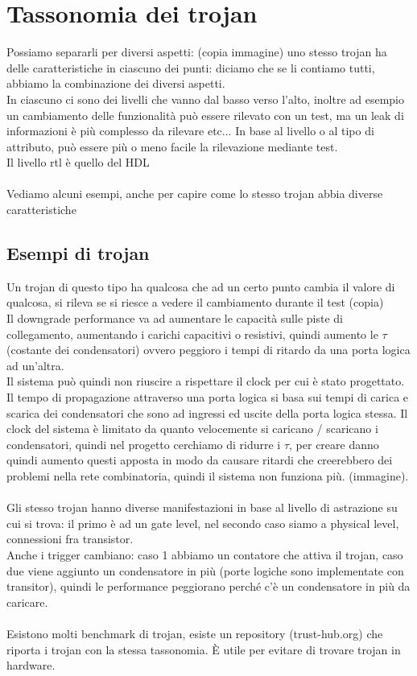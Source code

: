 \documentclass[oneside, 12pt]{extbook}
\begin{document}
\section{Tassonomia dei trojan}
Possiamo separarli per diversi aspetti:
(copia immagine)
uno stesso trojan ha delle caratteristiche in ciascuno dei punti: diciamo che se li contiamo tutti, abbiamo la combinazione dei diversi aspetti.\\In ciascuno ci sono dei livelli che vanno dal basso verso l'alto, inoltre ad esempio un cambiamento delle funzionalità può essere rilevato con un test, ma un leak di informazioni è più complesso da rilevare etc... In base al livello o al tipo di attributo, può essere più o meno facile la rilevazione mediante test.\\Il livello rtl è quello del HDL\\\\Vediamo alcuni esempi, anche per capire come lo stesso trojan abbia diverse caratteristiche
\subsection{Esempi di trojan}
Un trojan di questo tipo ha qualcosa che ad un certo punto cambia il valore di qualcosa, si rileva se si riesce a vedere il cambiamento durante il test
(copia)\\Il downgrade performance va ad aumentare le capacità sulle piste di collegamento, aumentando i carichi capacitivi o resistivi, quindi aumento le $\tau$ (costante dei condensatori) ovvero peggioro i tempi di ritardo da una porta logica ad un'altra.\\Il sistema può quindi non riuscire a rispettare il clock per cui è stato progettato. Il tempo di propagazione attraverso una porta logica si basa sui tempi di carica e scarica dei condensatori che sono ad ingressi ed uscite della porta logica stessa. Il clock del sistema è limitato da quanto velocemente si caricano / scaricano i condensatori, quindi nel progetto cerchiamo di ridurre i $\tau$, per creare danno quindi aumento questi apposta in modo da causare ritardi che creerebbero dei problemi nella rete combinatoria, quindi il sistema non funziona più. (immagine).\\\\Gli stesso trojan hanno diverse manifestazioni in base al livello di astrazione su cui si trova: il primo è ad un gate level, nel secondo caso siamo a physical level, connessioni fra transistor.\\Anche i trigger cambiano: caso 1 abbiamo un contatore che attiva il trojan, caso due viene aggiunto un condensatore in più (porte logiche sono implementate con transitor), quindi le performance peggiorano perché c'è un condensatore in più da caricare.\\\\Esistono molti benchmark di trojan, esiste un repository (trust-hub.org) che riporta i trojan con la stessa tassonomia. È utile per evitare di trovare trojan in hardware.
\end{document}
